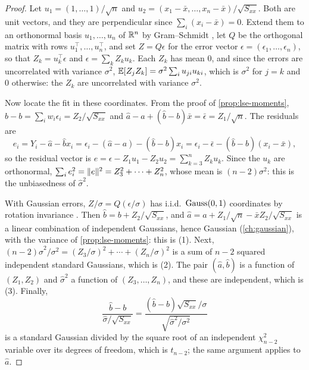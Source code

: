 \begin{proof}
Let $u_1 = (1, \ldots, 1)/\sqrt{n}$ and $u_2 = (x_1 - \bar{x}, \ldots, x_n - \bar{x})/\sqrt{S_{xx}}$.
Both are unit vectors, and they are perpendicular since $\sum_i (x_i - \bar{x}) = 0$.
Extend them to an orthonormal basis $u_1, \ldots, u_n$ of $\mathbb{R}^n$ by Gram--Schmidt , let $Q$ be the orthogonal matrix with rows $u_1^\top, \ldots, u_n^\top$, and set $Z = Q\epsilon$ for the error vector $\epsilon = (\epsilon_1, \ldots, \epsilon_n)$, so that $Z_k = u_k^\top\epsilon$ and $\epsilon = \sum_k Z_ku_k$.
Each $Z_k$ has mean $0$, and since the errors are uncorrelated with variance $\sigma^2$, $\operatorname*{\mathbb{E}}[Z_jZ_k] = \sigma^2\sum_i u_{ji}u_{ki}$, which is $\sigma^2$ for $j = k$ and $0$ otherwise: the $Z_k$ are uncorrelated with variance $\sigma^2$.

Now locate the fit in these coordinates.
From the proof of \cref{prop:lse-moments}, $\hat{b} - b = \sum_i w_i\epsilon_i = Z_2/\sqrt{S_{xx}}$ and $\hat{a} - a + (\hat{b} - b)\bar{x} = \bar{\epsilon} = Z_1/\sqrt{n}$.
The residuals are
\[
e_i = Y_i - \hat{a} - \hat{b}x_i = \epsilon_i - (\hat{a} - a) - (\hat{b} - b)x_i = \epsilon_i - \bar{\epsilon} - (\hat{b} - b)(x_i - \bar{x}),
\]
so the residual vector is $e = \epsilon - Z_1u_1 - Z_2u_2 = \sum_{k=3}^n Z_ku_k$.
Since the $u_k$ are orthonormal, $\sum_i e_i^2 = \lVert e\rVert^2 = Z_3^2 + \cdots + Z_n^2$, whose mean is $(n - 2)\sigma^2$: this is the unbiasedness of $\hat{\sigma}^2$.

With Gaussian errors, $Z/\sigma = Q(\epsilon/\sigma)$ has i.i.d.\ $\text{Gauss}(0, 1)$ coordinates by rotation invariance .
Then $\hat{b} = b + Z_2/\sqrt{S_{xx}}$, and $\hat{a} = a + Z_1/\sqrt{n} - \bar{x}Z_2/\sqrt{S_{xx}}$ is a linear combination of independent Gaussians, hence Gaussian (\cref{ch:gaussian}), with the variance of \cref{prop:lse-moments}: this is (1).
Next, $(n - 2)\hat{\sigma}^2/\sigma^2 = (Z_3/\sigma)^2 + \cdots + (Z_n/\sigma)^2$ is a sum of $n - 2$ squared independent standard Gaussians, which is (2).
The pair $(\hat{a}, \hat{b})$ is a function of $(Z_1, Z_2)$ and $\hat{\sigma}^2$ a function of $(Z_3, \ldots, Z_n)$, and these are independent, which is (3).
Finally,
\[
\frac{\hat{b} - b}{\hat{\sigma}/\sqrt{S_{xx}}} = \frac{(\hat{b} - b)\sqrt{S_{xx}}/\sigma}{\sqrt{\hat{\sigma}^2/\sigma^2}}
\]
is a standard Gaussian divided by the square root of an independent $\chi^2_{n-2}$ variable over its degrees of freedom, which is $t_{n-2}$; the same argument applies to $\hat{a}$.
\end{proof}

